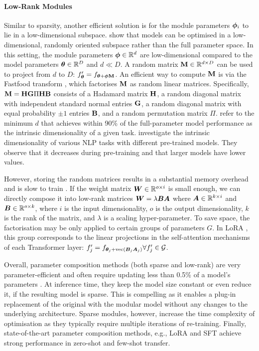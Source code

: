 \documentclass[10pt]{article} %
\begin{document}
\paragraph*{Low-Rank Modules} 
Similar to sparsity, another efficient solution is for the module parameters ${\bm{\phi}}_i$ to lie in a low-dimensional subspace. \citet{Li2018intrinsic} show that models can be optimised in a low-dimensional, randomly oriented subspace rather than the full parameter space. In this setting, the module parameters ${\bm{\phi}} \in \mathbb{R}^d$ are low-dimensional compared to the model parameters ${\bm{\theta}} \in \mathbb{R}^D$ and $d \ll D$. A random matrix ${\mathbf{M}} \in \mathbb{R}^{d \times D}$ can be used to project from $d$ to $D$: $f^\prime_{{\bm{\theta}}} = f_{{\bm{\theta}}+{\bm{\phi}} {\mathbf{M}}}$. An efficient way to compute ${\mathbf{M}}$ is via the Fastfood transform \citep{le2013fastfood}, which factorises ${\mathbf{M}}$ as random linear matrices. Specifically, ${\mathbf{M}} = {\mathbf{H}} {\mathbf{G}} \Pi {\mathbf{H}} {\mathbf{B}}$ consists of a Hadamard matrix ${\mathbf{H}}$, a random diagonal matrix with independent standard normal entries ${\mathbf{G}}$, a random diagonal matrix with equal probability $\pm 1$ entries ${\mathbf{B}}$, and a random permutation matrix $\Pi$.
\citet{Li2018intrinsic} refer to the minimum $d$ that achieves within 90\% of the full-parameter model performance as the intrinsic dimensionality of a given task. \citet{aghajanyan-etal-2021-intrinsic} investigate the intrinsic dimensionality of various NLP tasks with different pre-trained models. They observe that it decreases during pre-training and that larger models have lower values.

However, storing the random matrices results in a substantial memory overhead and is slow to train \citep{Mahabadi2021Compacter}. If the weight matrix ${\bm{W}} \in \mathbb{R}^{o \times i}$ is small enough, we can directly compose it into low-rank matrices ${\bm{W}} = \lambda {\bm{B}} {\bm{A}}$ where ${\bm{A}} \in \mathbb{R}^{k \times i}$ and ${\bm{B}} \in \mathbb{R}^{o \times k}$, where $i$ is the input dimensionality, $o$ is the output dimensionality, $k$ is the rank of the matrix, and $\lambda$ is a scaling hyper-parameter. To save space, the factorisation may be only applied to certain groups of parameters $G$. In LoRA \citep{hu2021lora}, this group corresponds to the linear projections in the self-attention mechanisms of each Transformer layer: $f^\prime_j = f_{{\bm{\theta}}_j+ \text{vec}({\bm{B}}_j {\bm{A}}_j)} \forall f_j^\prime \in \mathcal{G}$.

Overall, parameter composition methods (both sparse and low-rank) are very parameter-efficient and often require updating less than 0.5\% of a model's parameters \citep{guo-etal-2021-parameter}. At inference time, they keep the model size constant or even reduce it, if the resulting model is sparse. This is compelling as it enables a plug-in replacement of the original with the modular model without any changes to the underlying architecture. Sparse modules, however, increase the time complexity of optimisation as they typically require multiple iterations of re-training. Finally, state-of-the-art parameter composition methods, e.g., LoRA \citep{hu2021lora} and SFT \citep{ansell2021composable} achieve strong performance in zero-shot and few-shot transfer. 
\end{document}
